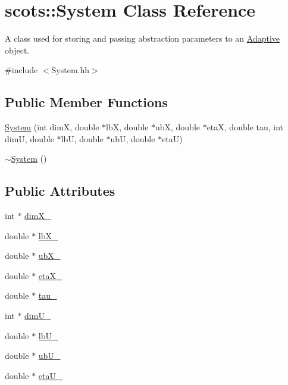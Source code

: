 \hypertarget{classscots_1_1System}{}\section{scots\+:\+:System Class Reference}
\label{classscots_1_1System}


A class used for storing and passing abstraction parameters to an \hyperlink{classscots_1_1Adaptive}{Adaptive} object.  




{\ttfamily \#include $<$System.\+hh$>$}

\subsection*{Public Member Functions}
\begin{DoxyCompactItemize}
\item 
\hyperlink{classscots_1_1System_a3aabe6325daaccf720eb3cd3864f39ac}{System} (int dimX, double $\ast$lbX, double $\ast$ubX, double $\ast$etaX, double tau, int dimU, double $\ast$lbU, double $\ast$ubU, double $\ast$etaU)
\item 
\hyperlink{classscots_1_1System_ade30e664368b236c4e093263ed21e0a1}{$\sim$\+System} ()
\end{DoxyCompactItemize}
\subsection*{Public Attributes}
\begin{DoxyCompactItemize}
\item 
int $\ast$ \hyperlink{classscots_1_1System_a612490e2a867f41737053c45497b3149}{dim\+X\+\_\+}
\item 
double $\ast$ \hyperlink{classscots_1_1System_a174089fcded761ebd6ec04ba1ef86bb7}{lb\+X\+\_\+}
\item 
double $\ast$ \hyperlink{classscots_1_1System_a89f05478d60c393b427231f255b3f7c7}{ub\+X\+\_\+}
\item 
double $\ast$ \hyperlink{classscots_1_1System_a1e4caa11c320b3aef9fa3b22ba454b69}{eta\+X\+\_\+}
\item 
double $\ast$ \hyperlink{classscots_1_1System_afbd67f26ca2f55a252399cbf6e59bdb7}{tau\+\_\+}
\item 
int $\ast$ \hyperlink{classscots_1_1System_a6000c540dbe568cdce5130e9afde469d}{dim\+U\+\_\+}
\item 
double $\ast$ \hyperlink{classscots_1_1System_abd761d301651bee8486f7803972f720a}{lb\+U\+\_\+}
\item 
double $\ast$ \hyperlink{classscots_1_1System_a722fea2f6aa331c64310f56ef32a88ba}{ub\+U\+\_\+}
\item 
double $\ast$ \hyperlink{classscots_1_1System_a69bc62ca24aa499f462dd6870c4e0121}{eta\+U\+\_\+}
\end{DoxyCompactItemize}


